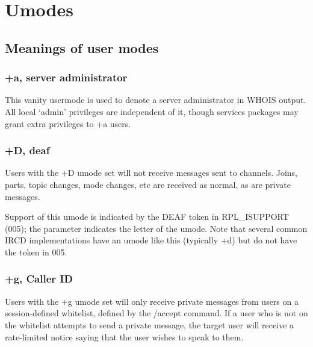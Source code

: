\chapter{Umodes}
\label{umodes}

\section{Meanings of user modes}
\label{umodelist}

\subsection{+a, server administrator}

	This vanity usermode is used to denote a server administrator in WHOIS
	output. All local `admin' privileges are independent of it, though
	services packages may grant extra privileges to +a users.


\subsection{+D, deaf}

	Users with the +D umode set will not receive messages sent to channels.
	Joins, parts, topic changes, mode changes, etc are received as normal,
	as are private messages.
 

	Support of this umode is indicated by the DEAF token in
	RPL\_ISUPPORT (005); the parameter indicates the letter
	of the umode. Note that several common IRCD implementations have
	an umode like this (typically +d) but do not have the token in 005.


\subsection{+g, Caller ID}

	Users with the +g umode set will only receive private messages from
	users on a session-{}defined whitelist, defined by the /accept command.
	If a user who is not on the whitelist attempts to send a private
	message, the target user will receive a rate-{}limited notice saying
	that the user wishes to speak to them.
 

